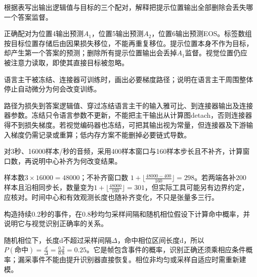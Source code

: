 \begin{exercises}
\begin{exercise} 根据表写出输出逻辑值与目标的三个配对，解释把提示位置输出全部删除会丢失哪一个答案监督。

\begin{solution}
正确配对为位置4输出预测$A_1$，位置5输出预测$A_2$，位置6输出预测EOS。标签数组按目标位置存储后由因果损失移位，不能再重复移位。提示位置本身不作为目标，却产生第一个答案的预测；删除所有提示位置输出会丢掉$A_1$监督。视觉位置仍应被注意力读取，即使其直接目标被忽略。
\end{solution}
\end{exercise}

\begin{exercise} 语言主干被冻结、连接器可训练时，画出必要梯度路径；说明在语言主干周围整体停止自动微分为何会改变训练。

\begin{solution}
路径为损失到答案逻辑值、穿过冻结语言主干的输入雅可比、到连接器输出及连接器参数。冻结只令语言参数不更新，不能把主干输出从计算图detach，否则连接器得不到损失梯度。若视觉编码器也冻结，可把其输出视为常量，但连接器及下游输入梯度仍需记录或重算；低内存方案不能删掉必要链式导数。
\end{solution}
\end{exercise}

\begin{exercise}\optional 对3秒、16000样本/秒的音频，采用400样本窗口与160样本步长且不补齐，计算窗口数，再说明中心补齐为何改变结果。

\begin{solution}
样本数$3\times16000=48000$；不补齐窗口数 $1+\lfloor\frac{48000-400}{160}\rfloor=298$。若两端各补200样本且沿相同步长，数量变为$1+\lfloor\frac{48000}{160}\rfloor=301$，但实际工具可能另有边界约定，应核对。时间中心和有效观测长度也随补齐变化，不只是张量多三行。
\end{solution}
\end{exercise}

\begin{exercise}\optional 构造持续0.2秒的事件，在0.8秒均匀采样间隔和随机相位假设下计算命中概率，并说明它与视觉识别正确率的关系。

\begin{solution}
随机相位下，长度d不超过采样间隔$\Delta$，命中相位区间长度d，所以$P(\text{命中})=\frac{d}{\Delta}=\frac{0.2}{0.8}=0.25$。它是帧包含事件的概率，识别正确还须乘相应条件概率；漏采事件不能由提升识别器直接恢复。相位非均匀或采样自适应时需重新建模。
\end{solution}
\end{exercise}


\end{exercises}
